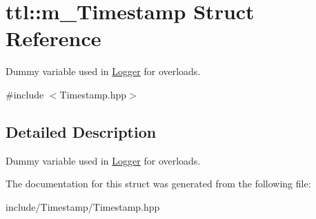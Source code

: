 \hypertarget{structttl_1_1m___timestamp}{\section{ttl\-:\-:m\-\_\-\-Timestamp Struct Reference}
\label{structttl_1_1m___timestamp}
}


Dummy variable used in \hyperlink{classttl_1_1_logger}{Logger} for overloads.  




{\ttfamily \#include $<$Timestamp.\-hpp$>$}



\subsection{Detailed Description}
Dummy variable used in \hyperlink{classttl_1_1_logger}{Logger} for overloads. 

The documentation for this struct was generated from the following file\-:\begin{DoxyCompactItemize}
\item 
include/\-Timestamp/Timestamp.\-hpp\end{DoxyCompactItemize}

